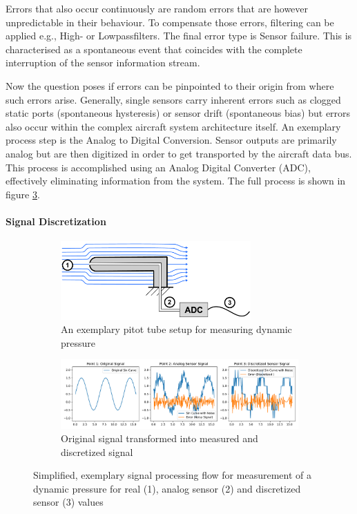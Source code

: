 Errors that also occur continuously are random errors that are however unpredictable in their behaviour. To compensate those errors, filtering can be applied e.g., High- or Lowpassfilters. The final error type is Sensor failure. This is characterised as a spontaneous event that coincides with the complete interruption of the sensor information stream.


Now the question poses if errors can be pinpointed to their origin from where such errors arise. Generally, single sensors carry inherent errors such as clogged static ports (spontaneous hysteresis) or sensor drift (spontaneous bias) but errors also occur within the complex aircraft system architecture itself. An exemplary process step is the Analog to Digital Conversion. Sensor outputs are primarily analog but are then digitized in order to get transported by the aircraft data bus. This process is accomplished using an Analog Digital Converter (ADC), effectively eliminating information from the system. The full process is shown in figure \ref{fig:signal_processing}.

\paragraph{Signal Discretization}





\begin{figure}[!h]
    \centering
    \begin{subfigure}{\textwidth}
        \centering
        \includegraphics[width=0.8\textwidth]{03_figures/signal_recording}
        \caption{An exemplary pitot tube setup for measuring dynamic pressure}
        \label{fig:signal_processing_setup}
    \end{subfigure}
    \begin{subfigure}{\textwidth}
        \centering
        \includegraphics[width=\textwidth]{03_figures/python_functions/images/signal_processing_plots}
        \caption{Original signal transformed into measured and discretized signal}
        \label{fig:signal_processing_plots}
    \end{subfigure}
    \caption{Simplified, exemplary signal processing flow for measurement of a dynamic pressure for real (1), analog sensor (2) and discretized sensor (3) values}
    \label{fig:signal_processing}
\end{figure}


